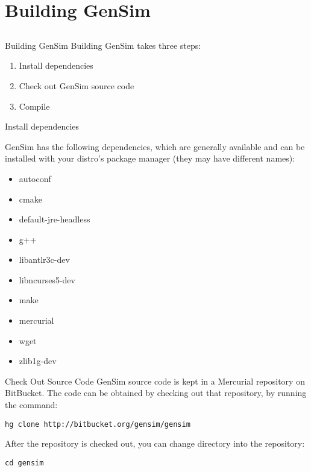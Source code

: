 \section{Building GenSim}
\subsection{}

\begin{frame}{Building GenSim}
Building GenSim takes three steps:
\begin{enumerate}
\item Install dependencies
\item Check out GenSim source code
\item Compile
\end{enumerate}
\end{frame}

\begin{frame}{Install dependencies}

GenSim has the following dependencies, which are generally available
and can be installed with your distro's package manager (they may have
different names):

\begin{itemize}
\item autoconf
\item cmake
\item default-jre-headless
\item g++
\item libantlr3c-dev
\item libncurses5-dev
\item make
\item mercurial
\item wget
\item zlib1g-dev
\end{itemize}

\end{frame}

\begin{frame}[fragile]{Check Out Source Code}
GenSim source code is kept in a Mercurial repository on BitBucket. The
code can be obtained by checking out that repository, by running the 
command:

\begin{lstlisting}
hg clone http://bitbucket.org/gensim/gensim
\end{lstlisting}

After the repository is checked out, you can change directory into the repository:

\begin{lstlisting}
cd gensim
\end{lstlisting}

\end{frame}

